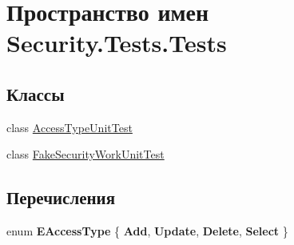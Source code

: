 \hypertarget{namespace_security_1_1_tests_1_1_tests}{}\section{Пространство имен Security.\+Tests.\+Tests}
\label{namespace_security_1_1_tests_1_1_tests}
\subsection*{Классы}
\begin{DoxyCompactItemize}
\item 
class \hyperlink{class_security_1_1_tests_1_1_tests_1_1_access_type_unit_test}{Access\+Type\+Unit\+Test}
\item 
class \hyperlink{class_security_1_1_tests_1_1_tests_1_1_fake_security_work_unit_test}{Fake\+Security\+Work\+Unit\+Test}
\end{DoxyCompactItemize}
\subsection*{Перечисления}
\begin{DoxyCompactItemize}
\item 
\mbox{\label{namespace_security_1_1_tests_1_1_tests_a10a1204c1c55b22c7a50101fac60539d}} 
enum {\bfseries E\+Access\+Type} \{ {\bfseries Add}, 
{\bfseries Update}, 
{\bfseries Delete}, 
{\bfseries Select}
 \}
\end{DoxyCompactItemize}
